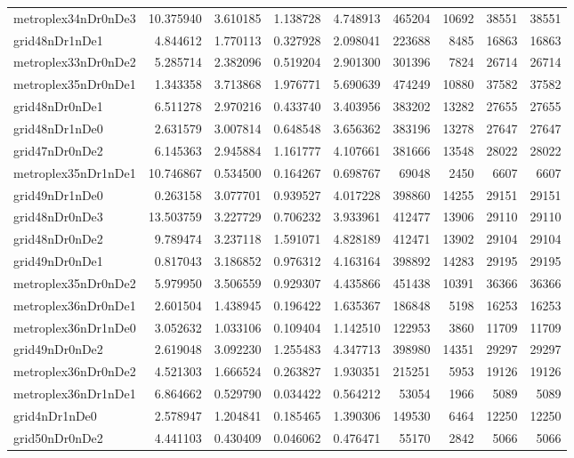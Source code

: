\begin{longtable}{|l|r|r|r|r|r|r|r|r|}
metroplex34nDr0nDe3 & 10.375940 & 3.610185 & 1.138728 & 4.748913 & 465204 & 10692 & 38551 & 38551 \\
grid48nDr1nDe1 & 4.844612 & 1.770113 & 0.327928 & 2.098041 & 223688 & 8485 & 16863 & 16863 \\
metroplex33nDr0nDe2 & 5.285714 & 2.382096 & 0.519204 & 2.901300 & 301396 & 7824 & 26714 & 26714 \\
metroplex35nDr0nDe1 & 1.343358 & 3.713868 & 1.976771 & 5.690639 & 474249 & 10880 & 37582 & 37582 \\
grid48nDr0nDe1 & 6.511278 & 2.970216 & 0.433740 & 3.403956 & 383202 & 13282 & 27655 & 27655 \\
grid48nDr1nDe0 & 2.631579 & 3.007814 & 0.648548 & 3.656362 & 383196 & 13278 & 27647 & 27647 \\
grid47nDr0nDe2 & 6.145363 & 2.945884 & 1.161777 & 4.107661 & 381666 & 13548 & 28022 & 28022 \\
metroplex35nDr1nDe1 & 10.746867 & 0.534500 & 0.164267 & 0.698767 & 69048 & 2450 & 6607 & 6607 \\
grid49nDr1nDe0 & 0.263158 & 3.077701 & 0.939527 & 4.017228 & 398860 & 14255 & 29151 & 29151 \\
grid48nDr0nDe3 & 13.503759 & 3.227729 & 0.706232 & 3.933961 & 412477 & 13906 & 29110 & 29110 \\
grid48nDr0nDe2 & 9.789474 & 3.237118 & 1.591071 & 4.828189 & 412471 & 13902 & 29104 & 29104 \\
grid49nDr0nDe1 & 0.817043 & 3.186852 & 0.976312 & 4.163164 & 398892 & 14283 & 29195 & 29195 \\
metroplex35nDr0nDe2 & 5.979950 & 3.506559 & 0.929307 & 4.435866 & 451438 & 10391 & 36366 & 36366 \\
metroplex36nDr0nDe1 & 2.601504 & 1.438945 & 0.196422 & 1.635367 & 186848 & 5198 & 16253 & 16253 \\
metroplex36nDr1nDe0 & 3.052632 & 1.033106 & 0.109404 & 1.142510 & 122953 & 3860 & 11709 & 11709 \\
grid49nDr0nDe2 & 2.619048 & 3.092230 & 1.255483 & 4.347713 & 398980 & 14351 & 29297 & 29297 \\
metroplex36nDr0nDe2 & 4.521303 & 1.666524 & 0.263827 & 1.930351 & 215251 & 5953 & 19126 & 19126 \\
metroplex36nDr1nDe1 & 6.864662 & 0.529790 & 0.034422 & 0.564212 & 53054 & 1966 & 5089 & 5089 \\
grid4nDr1nDe0 & 2.578947 & 1.204841 & 0.185465 & 1.390306 & 149530 & 6464 & 12250 & 12250 \\
grid50nDr0nDe2 & 4.441103 & 0.430409 & 0.046062 & 0.476471 & 55170 & 2842 & 5066 & 5066 \\

\end{longtable}

